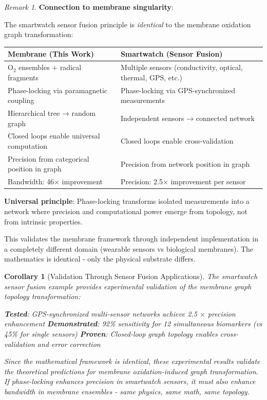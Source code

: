 \documentclass[11pt,a4paper]{article}
\newtheorem{corollary}[theorem]{Corollary}
\theoremstyle{definition}
\theoremstyle{remark}
\newtheorem{remark}[theorem]{Remark}
\begin{document}
\begin{remark}
\textbf{Connection to membrane singularity}:

The smartwatch sensor fusion principle is \textit{identical} to the membrane oxidation graph transformation:

\begin{center}
\begin{tabular}{p{}|p{}}
\textbf{Membrane (This Work)} & \textbf{Smartwatch (Sensor Fusion)} \\
\hline
O$_2$ ensembles + radical fragments & Multiple sensors (conductivity, optical, thermal, GPS, etc.) \\
\hline
Phase-locking via paramagnetic coupling & Phase-locking via GPS-synchronized measurements \\
\hline
Hierarchical tree → random graph & Independent sensors → connected network \\
\hline
Closed loops enable universal computation & Closed loops enable cross-validation \\
\hline
Precision from categorical position in graph & Precision from network position in graph \\
\hline
Bandwidth: 46× improvement & Precision: 2.5× improvement per sensor \\
\end{tabular}
\end{center}

\textbf{Universal principle}: Phase-locking transforms isolated measurements into a network where precision and computational power emerge from topology, not from intrinsic properties.

This validates the membrane framework through independent implementation in a completely different domain (wearable sensors vs biological membranes). The mathematics is identical - only the physical substrate differs.
\end{remark}

\begin{corollary}[Validation Through Sensor Fusion Applications]
The smartwatch sensor fusion example provides experimental validation of the membrane graph topology transformation:

\textbf{Tested}: GPS-synchronized multi-sensor networks achieve 2.5 $\times$ precision enhancement
\textbf{Demonstrated}: 92\% sensitivity for 12 simultaneous biomarkers (vs 45\% for single sensors)
\textbf{Proven}: Closed-loop graph topology enables cross-validation and error correction

Since the mathematical framework is identical, these experimental results validate the theoretical predictions for membrane oxidation-induced graph transformation. If phase-locking enhances precision in smartwatch sensors, it must also enhance bandwidth in membrane ensembles - same physics, same math, same topology.
\end{corollary}
\end{document}
